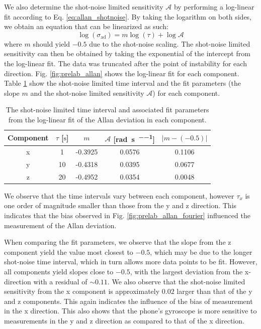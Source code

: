 \documentclass[a4paper]{report}
\numberwithin{equation}{section}
\begin{document}
We also determine the shot-noise limited sensitivity $\mathcal{A}$ 
by performing a log-linear fit according to Eq. \ref{eq:allan_shotnoise}. 
By taking the logarithm on both sides, we obtain an equation that can be linearized as such:
\begin{equation}
	\log(\sigma_{\mathrm{ad}}) = m \log(\tau) + \log \mathcal{A}
\end{equation}
where $m$ should yield $-0.5$ due to the shot-noise scaling. The shot-noise limited sensitivity can then be obtained
by taking the exponential of the intercept from the log-linear fit. The data was truncated after the point of instability for 
each direction. Fig. \ref{fig:prelab_allan} shows the log-linear fit for each component. Table \ref{tab:prelab_allan_vals} show the shot-noise limited time interval and the fit parameters (the slope $m$ and the shot-noise 
limited sensitivity $\mathcal{A}$) for each component. 

\begin{table}[h!]
	\centering
	\begin{tabular}{|c|c|c|c|c|}
		\hline 
		Component & $\tau$ [$\si{\second}$] & $m$ & $\mathcal{A}$ [\si[]{\radian\per\second\per\sqrt{\hertz}}] & $|m - (-0.5)|$\\ \hline
		x & 1 & -0.3925 & 0.0576  & 0.1106\\ \hline
		y & 10 & -0.4318 & 0.0395 & 0.0677\\ \hline
		z & 20 & -0.4952 & 0.0354 & 0.0048\\ \hline
	\end{tabular}
	\caption{The shot-noise limited time interval and associated fit parameters from the log-linear fit of the Allan deviation
			in each component.}
	\label{tab:prelab_allan_vals}
\end{table}

We observe that the time intervals vary between each component, however $\tau_x$ is one order of magnitude smaller than those from 
the y and z direction. This indicates that the bias observed in Fig. \ref{fig:prelab_allan_fourier} influenced the measurement of the 
Allan deviation. \par 

When comparing the fit parameters, we observe that the slope from the z component yield the value most closest to $-0.5$, which may be 
due to the longer shot-noise time interval, which in turn allows more data points to be fit. However, all components yield slopes
close to $-0.5$, with the largest deviation from the x-direction with a residual of $\sim 0.11$. We also observe that the shot-noise
limited sensitivity from the x component is approximately $0.02$ larger than that of the y and z components. This again 
indicates the influence of the bias of measurement in the x direction. This also shows that the phone's gyroscope is more sensitive
to measurements in the y and z direction as compared to that of the x direction. 
\end{document}
